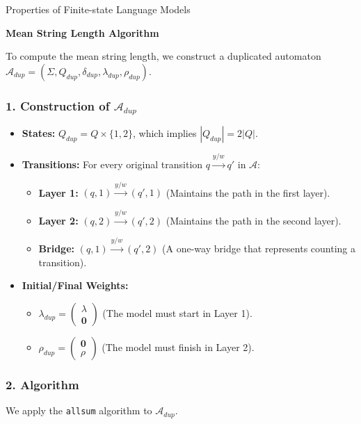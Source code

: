 \begin{question}{Properties of Finite-state Language Models}

\begin{subquestion}{\textbf{Mean String Length Algorithm}}

To compute the mean string length, we construct a duplicated automaton $\mathcal{A}_{dup} = (\Sigma, Q_{dup}, \delta_{dup}, \lambda_{dup}, \rho_{dup})$.

\subsubsection*{1. Construction of $\mathcal{A}_{dup}$}
\begin{itemize}
    \item \textbf{States:} $Q_{dup} = Q \times \{1, 2\}$, which implies $|Q_{dup}| = 2|Q|$.
    \item \textbf{Transitions:} For every original transition $q \xrightarrow{y/w} q'$ in $\mathcal{A}$:
    \begin{itemize}
        \item \textbf{Layer 1:} $(q, 1) \xrightarrow{y/w} (q', 1)$ (Maintains the path in the first layer).
        \item \textbf{Layer 2:} $(q, 2) \xrightarrow{y/w} (q', 2)$ (Maintains the path in the second layer).
        \item \textbf{Bridge:} $(q, 1) \xrightarrow{y/w} (q', 2)$ (A one-way bridge that represents counting a transition).
    \end{itemize}
    \item \textbf{Initial/Final Weights:}
    \begin{itemize}
        \item $\lambda_{dup} = \begin{pmatrix} \lambda \\ \mathbf{0} \end{pmatrix}$ (The model must start in Layer 1).
        \item $\rho_{dup} = \begin{pmatrix} \mathbf{0} \\ \rho \end{pmatrix}$ (The model must finish in Layer 2).
    \end{itemize}
\end{itemize}

\subsubsection*{2. Algorithm}
We apply the \texttt{allsum} algorithm to $\mathcal{A}_{dup}$.


\end{subquestion}
\end{question}
